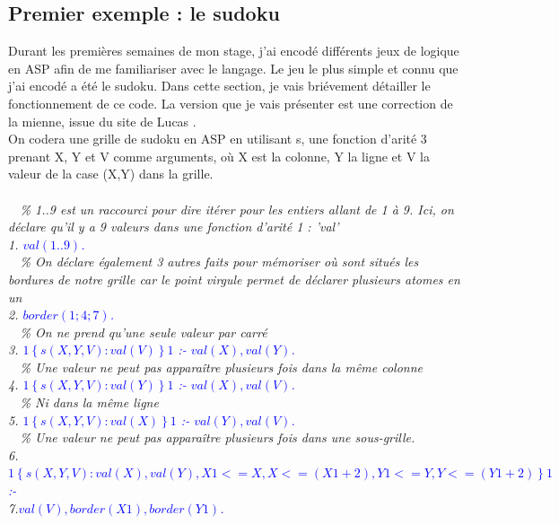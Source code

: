 \documentclass[10pt,a4paper]{article}
\begin{document}
\subsection{Premier exemple : le sudoku}
Durant les premières semaines de mon stage, j'ai encodé différents jeux de logique en ASP afin de me familiariser avec le langage. Le jeu le plus simple et connu que j'ai encodé a été le sudoku. Dans cette section, je vais 
briévement détailler le fonctionnement de ce code. La version que je vais présenter est une correction de la mienne, issue du site de Lucas \cite{lucasbourneuf}.\\
On codera une grille de sudoku en ASP en utilisant s, une fonction d'arité 3 prenant X, Y et V comme arguments, où X est la colonne, Y la ligne et V la valeur de la case (X,Y) dans la grille.\\ \\
\emph{
	\textcolor{white}{2c}\% 1..9 est un raccourci pour dire itérer pour les entiers allant de 1 à 9. Ici, on déclare qu'il y a 9 valeurs dans une fonction d'arité 1 : 'val'\\
	1. \textcolor{blue}{$val(1..9)$.}\\
	\textcolor{white}{2c}\% On déclare également 3 autres faits pour mémoriser où sont situés les bordures de notre grille car le point virgule permet de déclarer plusieurs atomes en un\\
	2. \textcolor{blue}{$border(1;4;7)$.}\\
	\textcolor{white}{2c}\% On ne prend qu'une seule valeur par carré\\
	3. \textcolor{blue}{$1\left\{ s(X,Y,V): val(V) \right\}1$ :- $val(X), val(Y)$.}\\
	\textcolor{white}{2c}\% Une valeur ne peut pas apparaître plusieurs fois dans la même colonne\\
	4. \textcolor{blue}{$1\left\{ s(X,Y,V): val(Y) \right\}1$ :- $val(X), val(V)$.}\\
	\textcolor{white}{2c}\% Ni dans la même ligne\\
	5. \textcolor{blue}{$1\left\{ s(X,Y,V): val(X) \right\}1$ :- $val(Y), val(V)$.}\\
	\textcolor{white}{2c}\% Une valeur ne peut pas apparaître plusieurs fois dans une sous-grille.\\
	6. \textcolor{blue}{$1\left\{ s(X,Y,V): val(X), val(Y), X1<=X, X<=(X1+2), Y1<=Y, Y<=(Y1+2)\right\}1$ :-}\\
	7.\qquad\qquad\textcolor{blue}{$val(V), border(X1), border(Y1)$.}\\
}
\end{document}
